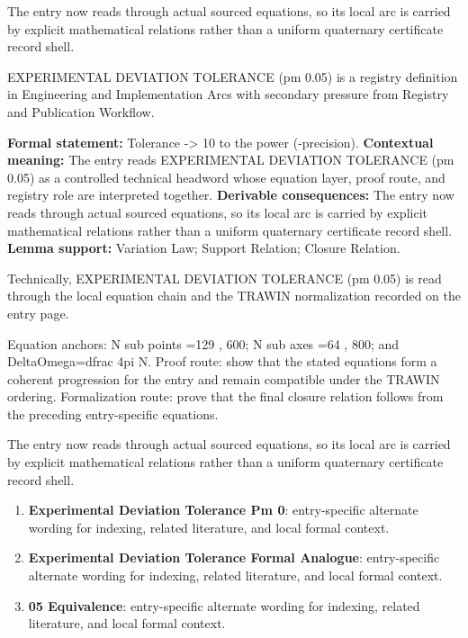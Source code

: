 The entry now reads through actual sourced equations, so its local arc is carried by explicit mathematical relations rather than a uniform quaternary certificate record shell.
\clearpage


\begingroup\small
{}
EXPERIMENTAL DEVIATION TOLERANCE (pm 0.05) is a registry definition in Engineering and Implementation Arcs with secondary pressure from Registry and Publication Workflow.

\begingroup\footnotesize\setlength{\emergencystretch}{3em}\sloppy
\textbf{Formal statement:} Tolerance -> 10 to the power (-precision). \textbf{Contextual meaning:} The entry reads EXPERIMENTAL DEVIATION TOLERANCE (pm 0.05) as a controlled technical headword whose equation layer, proof route, and registry role are interpreted together. \textbf{Derivable consequences:} The entry now reads through actual sourced equations, so its local arc is carried by explicit mathematical relations rather than a uniform quaternary certificate record shell. \textbf{Lemma support:} Variation Law; Support Relation; Closure Relation.\par
\endgroup

Technically, EXPERIMENTAL DEVIATION TOLERANCE (pm 0.05) is read through the local equation chain and the TRAWIN normalization recorded on the entry page.

Equation anchors: N sub points =129 , 600; N sub axes =64 , 800; and DeltaOmega=dfrac 4pi N. Proof route: show that the stated equations form a coherent progression for the entry and remain compatible under the TRAWIN ordering. Formalization route: prove that the final closure relation follows from the preceding entry-specific equations.

The entry now reads through actual sourced equations, so its local arc is carried by explicit mathematical relations rather than a uniform quaternary certificate record shell.
\endgroup

\begin{enumerate}[leftmargin=1.6em,itemsep=6pt,topsep=4pt]
\item \textbf{Experimental Deviation Tolerance Pm 0}: entry-specific alternate wording for indexing, related literature, and local formal context.
\item \textbf{Experimental Deviation Tolerance Formal Analogue}: entry-specific alternate wording for indexing, related literature, and local formal context.
\item \textbf{05 Equivalence}: entry-specific alternate wording for indexing, related literature, and local formal context.
\end{enumerate}

